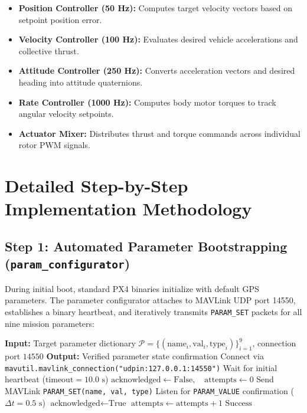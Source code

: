 \documentclass[11pt,a4paper]{article}
\begin{document}
\begin{itemize}[leftmargin=1.5em, itemsep=2pt]
  \item \textbf{Position Controller (50 Hz):} Computes target velocity vectors based on setpoint position error.
  \item \textbf{Velocity Controller (100 Hz):} Evaluates desired vehicle accelerations and collective thrust.
  \item \textbf{Attitude Controller (250 Hz):} Converts acceleration vectors and desired heading into attitude quaternions.
  \item \textbf{Rate Controller (1000 Hz):} Computes body motor torques to track angular velocity setpoints.
  \item \textbf{Actuator Mixer:} Distributes thrust and torque commands across individual rotor PWM signals.
\end{itemize}

\section{Detailed Step-by-Step Implementation Methodology}

\subsection{Step 1: Automated Parameter Bootstrapping (\texttt{param\_configurator})}
During initial boot, standard PX4 binaries initialize with default GPS parameters. The parameter configurator attaches to MAVLink UDP port 14550, establishes a binary heartbeat, and iteratively transmits \texttt{PARAM\_SET} packets for all nine mission parameters:

\begin{algorithm}[H]
\caption{MAVLink Headless Parameter Bootstrapping}
\begin{algorithmic}[1]
\State \textbf{Input:} Target parameter dictionary $\mathcal{P} = \{(\text{name}_i, \text{val}_i, \text{type}_i)\}_{i=1}^9$, connection port $14550$
\State \textbf{Output:} Verified parameter state confirmation
\State Connect via \texttt{mavutil.mavlink\_connection("udpin:127.0.0.1:14550")}
\State Wait for initial heartbeat ($\text{timeout} = 10.0\text{ s}$)
    \State $\text{acknowledged} \gets \text{False}, \quad \text{attempts} \gets 0$
        \State Send MAVLink \texttt{PARAM\_SET(name, val, type)}
        \State Listen for \texttt{PARAM\_VALUE} confirmation ($\Delta t = 0.5\text{ s}$)
            \State $\text{acknowledged} \gets \text{True}$
        \Else
            \State $\text{attempts} \gets \text{attempts} + 1$
        \EndIf
    \EndWhile
\EndFor
\State \Return $\text{Success}$
\end{algorithmic}
\end{algorithm}
\end{document}
